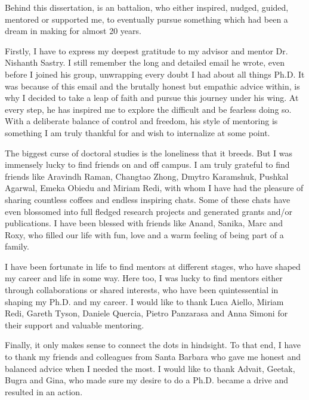 
\begin{acknowledgements}      

Behind this dissertation, is an battalion, who either inspired, nudged, guided, mentored or supported me, to eventually pursue something which had been a dream in making for almost 20 years. 

Firstly, I have to express my deepest gratitude to my advisor and mentor Dr. Nishanth Sastry. I still remember the long and detailed email he wrote, even before I joined his group, unwrapping every doubt I had about all things Ph.D. It was because of this email and the brutally honest but empathic advice within, is why I decided to take a leap of faith and pursue this journey under his wing.  At every step, he has inspired me to explore the difficult and be fearless doing so. With a deliberate balance of control and freedom, his style of mentoring is something I am truly thankful for and wish to internalize at some point.

The biggest curse of doctoral studies is the loneliness that it breeds. But I was immensely lucky to find friends on and off campus. I am truly grateful to find friends like Aravindh Raman, Changtao Zhong, Dmytro Karamshuk, Pushkal Agarwal, Emeka Obiedu and Miriam Redi, with whom I have had the pleasure of sharing countless coffees and endless inspiring chats. Some of these chats have even blossomed into full fledged research projects and generated grants and/or publications. I have been blessed with friends like Anand, Sanika, Marc and Roxy, who filled our life with fun, love and a warm feeling of being part of a family. 

I have been fortunate in life to find mentors at different stages, who have shaped my career and life in some way. Here too, I was lucky to find mentors either through collaborations or shared interests, who have been quintessential in shaping my Ph.D. and my career. I would like to thank Luca Aiello, Miriam Redi, Gareth Tyson, Daniele Quercia, Pietro Panzarasa and Anna Simoni for their support and valuable mentoring. 

Finally, it only makes sense to connect the dots in hindsight. To that end, I have to thank my friends and colleagues from Santa Barbara who gave me honest and balanced advice when I needed the most. I would like to thank Advait, Geetak, Bugra and Gina, who made sure my desire to do a Ph.D. became a drive and resulted in an action. 


\end{acknowledgements}
